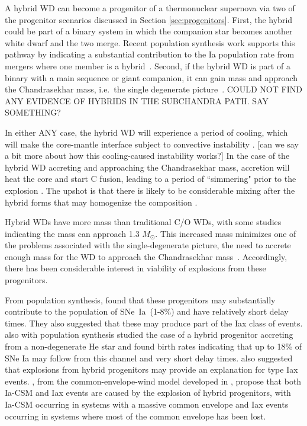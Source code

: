 \documentclass[iop,apj]{emulateapj}
\newcommand{\SNeIa}{SNe~Ia}
\newcommand{\Msun}{\ensuremath{M_\odot}}
\begin{document}
A hybrid WD can become a progenitor of a thermonuclear supernova via two
of the progenitor scenarios discussed in Section \ref{sec:progenitors}.
First, the hybrid could be part of a binary system in which the companion star becomes
another white dwarf and the two merge. Recent population synthesis work supports
this pathway by indicating a substantial contribution to the Ia population rate from
mergers where one member is a hybrid~\citep{yungelsonkuranov2017}. Second, if the hybrid
WD is part of a binary with a main sequence or giant companion, it can gain mass and
approach the Chandrasekhar mass, i.e.\  the single degenerate picture~\citep{willcoxetal2016}.
{\color{red} COULD NOT FIND ANY EVIDENCE OF HYBRIDS IN THE SUBCHANDRA PATH. SAY
SOMETHING?}

In either {\color{red}ANY} case, the hybrid WD will experience a period of cooling, which will
make the core-mantle interface subject to convective
instability \citep{brooksetal2017,schwabgaraud2018}.
{\color{blue} [can we say a bit more about how this cooling-caused instability works?]}
In the case of the
hybrid WD accreting and approaching the Chandrasekhar mass, accretion will
heat the core and start C fusion, leading to a period of ``simmering" prior
to the explosion \citep{PiroBild08}. The upshot is that there is likely to be considerable
mixing after the hybrid forms that may homogenize the composition
\citep{denissenkovetal2015,brooksetal2017,schwabgaraud2018}.

Hybrid WDs have more mass than traditional C/O WDs, with some studies indicating the
mass can approach 1.3 \Msun \citep{chenetal2014}. This increased mass
minimizes one of the problems associated with the single-degenerate picture,
the need to accrete enough mass for the WD to approach the Chandrasekhar
mass~\citep{chenetal2014,denissenkovetal2015,kromeretal2015}.
Accordingly, there has been considerable interest in viability of explosions from
these progenitors.

From population synthesis, \citet{mengpods2014} found that these
progenitors may substantially contribute to the population of \SNeIa\ (1-8\%) and have
relatively short delay times. They also suggested that these
may produce part of the Iax class of events. \citet{Wangetal2014} also with population
synthesis studied the case
of a hybrid progenitor accreting from a non-degenerate He star and found
birth rates indicating that up to 18\% of SNe Ia may follow from this channel
and very short delay times. \citet{Wangetal2014} also suggested that explosions
from hybrid progenitors may provide an explanation for type Iax events.
\citet{mengpods2018}, from the common-envelope-wind model developed in
\citet{mengpods2014}, propose that both Ia-CSM and Iax events
are caused by the explosion of hybrid progenitors, with Ia-CSM occurring in systems with
a massive common envelope and Iax events occurring in systems where most of the common envelope
has been lost.
\end{document}
